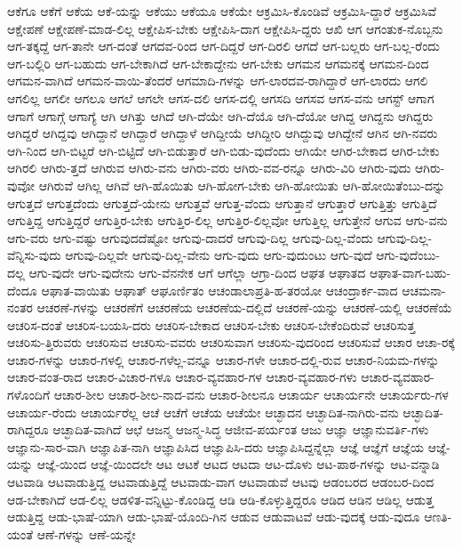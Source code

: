 {ಆಕೆಗೂ
ಆಕೆಗೆ
ಆಕೆಯ
ಆಕೆ-ಯನ್ನು
ಆಕೆಯು
ಆಕೆಯೂ
ಆಕೆಯೇ
ಆಕ್ರಮಿಸಿ-ಕೊಂಡಿವೆ
ಆಕ್ರಮಿಸಿ-ದ್ದಾರೆ
ಆಕ್ರಮಿಸಿವೆ
ಆಕ್ಷೇಪಣೆ
ಆಕ್ಷೇಪಣೆ-ಮಾಡ-ಲಿಲ್ಲ
ಆಕ್ಷೇಪಿಸ-ಬೇಕು
ಆಕ್ಷೇಪಿಸಿ-ದಾಗ
ಆಕ್ಷೇಪಿಸಿ-ದ್ದರು
ಆಖಿ
ಆಗ
ಆಗಂತುಕ-ನೊಬ್ಬನು
ಆಗ-ತಕ್ಕದ್ದೆ
ಆಗ-ತಾನೇ
ಆಗ-ದಂತೆ
ಆಗದವ-ರಿಂದ
ಆಗ-ದಿದ್ದರೆ
ಆಗ-ದಿರಲಿ
ಆಗದೆ
ಆಗ-ಬಲ್ಲರು
ಆಗ-ಬಲ್ಲ-ರೆಂದು
ಆಗ-ಬಲ್ಲಿರಿ
ಆಗ-ಬಹುದು
ಆಗ-ಬೇಕಾಗಿದೆ
ಆಗ-ಬೇಕಾದ್ದೇನು
ಆಗ-ಬೇಕು
ಆಗಮನ
ಆಗಮನಕ್ಕೆ
ಆಗಮನ-ದಿಂದ
ಆಗಮನ-ವಾಗಿದೆ
ಆಗಮನ-ವಾಯಿ-ತೆಂದರೆ
ಆಗಮಾದಿ-ಗಳನ್ನು
ಆಗ-ಲಾರದವ-ರಾಗಿದ್ದಾರೆ
ಆಗ-ಲಾರದು
ಆಗಲಿ
ಆಗಲಿಲ್ಲ
ಆಗಲೀ
ಆಗಲೂ
ಆಗಲೆ
ಆಗಲೇ
ಆಗಸ-ದಲಿ
ಆಗಸ-ದಲ್ಲಿ
ಆಗಸದಿ
ಆಗಸವ
ಆಗಸ-ವನು
ಆಗಸ್ಟ್
ಆಗಾಗ
ಆಗಾಗೆ
ಆಗಾಗ್ಗೆ
ಆಗಾಗ್ಯೆ
ಆಗಿ
ಆಗಿತ್ತು
ಆಗಿದೆ
ಆಗಿ-ದೆಯೇ
ಆಗಿ-ದೆಯೊ
ಆಗಿ-ದೆಯೋ
ಆಗಿದ್ದ
ಆಗಿದ್ದನು
ಆಗಿದ್ದರು
ಆಗಿದ್ದರೆ
ಆಗಿದ್ದವು
ಆಗಿದ್ದಾನೆ
ಆಗಿದ್ದಾರೆ
ಆಗಿದ್ದಾಳೆ
ಆಗಿದ್ದೀಯೆ
ಆಗಿದ್ದೀರಿ
ಆಗಿದ್ದುವು
ಆಗಿದ್ದೇನೆ
ಆಗಿನ
ಆಗಿ-ನವರು
ಆಗಿ-ನಿಂದ
ಆಗಿ-ಬಿಟ್ಟರೆ
ಆಗಿ-ಬಿಟ್ಟಿದೆ
ಆಗಿ-ಬಿಡುತ್ತಾರೆ
ಆಗಿ-ಬಿಡು-ವುದೆಂದು
ಆಗಿಯೇ
ಆಗಿರ-ಬೇಕಾದ
ಆಗಿರ-ಬೇಕು
ಆಗಿರಲಿ
ಆಗಿರು-ತ್ತದೆ
ಆಗಿರುವ
ಆಗಿರು-ವನು
ಆಗಿರು-ವರು
ಆಗಿರು-ವವ-ರನ್ನೂ
ಆಗಿರು-ವಿರಿ
ಆಗಿರು-ವುದು
ಆಗಿರು-ವುವೋ
ಆಗಿರುವೆ
ಆಗಿಲ್ಲ
ಆಗಿವೆ
ಆಗಿ-ಹೊಯಿತು
ಆಗಿ-ಹೋಗ-ಬೇಕು
ಆಗಿ-ಹೋಯಿತು
ಆಗಿ-ಹೋಯಿತೆಂಬು-ದನ್ನು
ಆಗುತ್ತದೆ
ಆಗುತ್ತದೆಂದು
ಆಗುತ್ತದೆ-ಯೇನು
ಆಗುತ್ತವೆ
ಆಗುತ್ತ-ವೆಂದು
ಆಗುತ್ತಾನೆ
ಆಗುತ್ತಾರೆ
ಆಗುತ್ತಿತ್ತು
ಆಗುತ್ತಿದೆ
ಆಗುತ್ತಿದ್ದ
ಆಗುತ್ತಿದ್ದರೆ
ಆಗುತ್ತಿರ-ಬೇಕು
ಆಗುತ್ತಿರ-ಲಿಲ್ಲ
ಆಗುತ್ತಿರ-ಲಿಲ್ಲವೋ
ಆಗುತ್ತಿಲ್ಲ
ಆಗುತ್ತೇನೆ
ಆಗುವ
ಆಗು-ವನು
ಆಗು-ವರು
ಆಗು-ವಷ್ಟು
ಆಗುವುದದೆಷ್ಟೋ
ಆಗುವು-ದಾದರೆ
ಆಗುವು-ದಿಲ್ಲ
ಆಗುವು-ದಿಲ್ಲ-ವೆಂದು
ಆಗುವು-ದಿಲ್ಲ-ವೆನ್ನಿಸು-ವುದು
ಆಗುವು-ದಿಲ್ಲವೇ
ಆಗುವು-ದಿಲ್ಲ-ವೇನು
ಆಗು-ವುದು
ಆಗು-ವುದುಂಟು
ಆಗು-ವುದೆ
ಆಗು-ವುದೆಂಬು-ದಲ್ಲ
ಆಗು-ವುದೇ
ಆಗು-ವುದೇನು
ಆಗು-ವೆನನೇಕ
ಆಗೆ
ಆಗೆಲ್ಲಾ
ಆಗ್ರಾ-ದಿಂದ
ಆಘತ
ಆಘಾತದ
ಆಘಾತ-ವಾಗ-ಬಹು-ದೆಂದೂ
ಆಘಾತ-ವಾಯಿತು
ಆಘಾತ್
ಆಘೂರ್ಣಿತಂ
ಆಚಂಡಾಲಾಪ್ರತಿ-ಹ-ತರಯೋ
ಆಚಂದ್ರಾರ್ಕ-ವಾದ
ಆಚಮನಾ-ನಂತರ
ಆಚರಣೆ-ಗಳನ್ನು
ಆಚರಣೆಗೆ
ಆಚರಣೆಯ
ಆಚರಣೆಯ-ದಲ್ಲಿದೆ
ಆಚರಣೆ-ಯನ್ನು
ಆಚರಣೆ-ಯಲ್ಲಿ
ಆಚರಣೆಯೆ
ಆಚರಿಸ-ದಂತೆ
ಆಚರಿಸ-ಬಯಸಿ-ದರು
ಆಚರಿಸ-ಬೇಕಾದ
ಆಚರಿಸ-ಬೇಕು
ಆಚರಿಸ-ಬೇಕೆಂದಿರುವೆ
ಆಚರಿಸುತ್ತ
ಆಚರಿಸು-ತ್ತಿರುವರು
ಆಚರಿಸುವ
ಆಚರಿಸು-ವವರು
ಆಚರಿಸುವಾಗ
ಆಚರಿಸು-ವುದರಿಂದ
ಆಚರಿಸುವೆ
ಆಚಾರ
ಆಚಾ-ರಕ್ಕೆ
ಆಚಾರ-ಗಳನ್ನು
ಆಚಾರ-ಗಳಲ್ಲಿ
ಆಚಾರ-ಗಳೆಲ್ಲ-ವನ್ನೂ
ಆಚಾರ-ಗಳೇ
ಆಚಾರ-ದಲ್ಲಿ-ರುವ
ಆಚಾರ-ನಿಯಮ-ಗಳನ್ನು
ಆಚಾರ-ವಂತ-ರಾದ
ಆಚಾರ-ವಿಚಾರ-ಗಳೂ
ಆಚಾರ-ವ್ಯವಹಾರ-ಗಳ
ಆಚಾರ-ವ್ಯವಹಾರ-ಗಳು
ಆಚಾರ-ವ್ಯವಹಾರ-ಗಳೊಂದಿಗೆ
ಆಚಾರ-ಶೀಲ
ಆಚಾರ-ಶೀಲ-ನಾದ-ವನು
ಆಚಾರ-ಶೀಲನೂ
ಆಚಾರ್ಯ
ಆಚಾರ್ಯನೇ
ಆಚಾರ್ಯರು-ಗಳ
ಆಚಾರ್ಯ-ರೆಂದು
ಆಚಾರ್ಯರೆಲ್ಲ
ಆಚೆ
ಆಚೆಗೆ
ಆಚೆಯ
ಆಚೆಯೇ
ಆಚ್ಛಾದನ
ಆಚ್ಛಾದಿತ-ನಾಗಿರು-ವನು
ಆಚ್ಛಾದಿತ-ರಾಗಿದ್ದರೂ
ಆಚ್ಛಾದಿತ-ವಾಗಿದೆ
ಆಛೆ
ಆಜನ್ಮ
ಆಜನ್ಮ-ಸಿದ್ಧ
ಆಜೀವ-ಪರ್ಯಂತ
ಆಜು
ಆಜ್ಞಾ
ಆಜ್ಞಾನುವರ್ತಿ-ಗಳು
ಆಜ್ಞಾನು-ಸಾರ-ವಾಗಿ
ಆಜ್ಞಾಪಿತ-ನಾಗಿ
ಆಜ್ಞಾಪಿಸಿದ
ಆಜ್ಞಾಪಿಸಿ-ದರು
ಆಜ್ಞಾಪಿಸಿದ್ದನ್ನೆಲ್ಲಾ
ಆಜ್ಞೆ
ಆಜ್ಞೆಗೆ
ಆಜ್ಞೆಯ
ಆಜ್ಞೆ-ಯನ್ನು
ಆಜ್ಞೆ-ಯಿಂದ
ಆಜ್ಞೆ-ಯಿಂದಲೇ
ಆಟ
ಆಟಕೆ
ಆಟದ
ಆಟದಾ
ಆಟ-ದೊಳು
ಆಟ-ಪಾಠ-ಗಳನ್ನು
ಆಟ-ವನ್ನಾಡಿ
ಆಟವಾಡಿ
ಆಟವಾಡುತ್ತಿದ್ದ
ಆಟವಾಡುತ್ತಿದ್ದೆ
ಆಟವಾಡು-ವಾಗ
ಆಟವಾಡುವೆ
ಆಟವು
ಆಡಂಬರದ
ಆಡಂಬರ-ದಿಂದ
ಆಡ-ಬೇಕಾಗಿದೆ
ಆಡ-ಲಿಲ್ಲ
ಆಡಳಿತ-ವನ್ನಿಟ್ಟು-ಕೊಂಡಿದ್ದ
ಆಡಿ
ಆಡಿ-ಕೊಳ್ಳುತ್ತಿದ್ದರೂ
ಆಡಿದ
ಆಡಿನ
ಆಡಿಲ್ಲ
ಆಡುತ್ತ
ಆಡುತ್ತಿದ್ದ
ಆಡು-ಭಾಷೆ-ಯಾಗಿ
ಆಡು-ಭಾಷೆ-ಯೊಂದಿ-ಗಿನ
ಆಡುವ
ಆಡುವಾಟವೆ
ಆಡು-ವುದಕ್ಕೆ
ಆಡು-ವುದೂ
ಆಣತಿ-ಯಂತೆ
ಆಣೆ-ಗಳನ್ನು
ಆಣೆ-ಯನ್ನೇ
}
